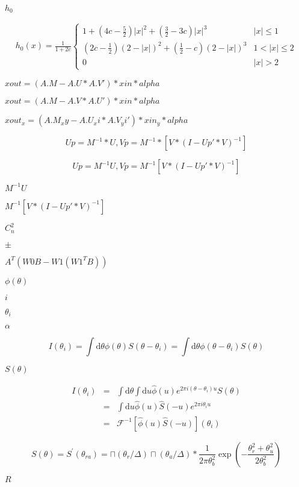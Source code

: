\documentclass{article}
\begin{document}
$h_{0}$
\pagebreak

\begin{eqnarray*} h_{0}(x)=\frac{1}{1+2c}\begin{cases} 1+(4c-\frac{5}{2})|x|^{2}+(\frac{3}{2}-3c)|x|^{3} & |x|\leq1\\ (2c-\frac{1}{2})(2-|x|)^{2}+(\frac{1}{2}-c)(2-|x|)^{3} & 1<|x|\leq2\\ 0 & |x|>2\end{cases}\end{eqnarray*}
\pagebreak

$xout=(A.M-A.U*A.V')*xin*alpha$
\pagebreak

$xout=(A.M-A.V*A.U')*xin*alpha$
\pagebreak

$xout_x=(A.M_xy-A.U_xi*A.V_yi')*xin_y*alpha$
\pagebreak

\[ Up=M^{-1}*U, Vp=M^{-1}*[V*(I-Up'*V)^{-1}] \]
\pagebreak

\[ Up=M^{-1}U, Vp=M^{-1}[V*(I-Up'*V)^{-1}] \]
\pagebreak

$M^{-1}U$
\pagebreak

$M^{-1}[V*(I-Up'*V)^{-1}]$
\pagebreak

$C_n^2$
\pagebreak

$\pm$
\pagebreak

$A^T(W0 B-W1 (W1^T B))$
\pagebreak

$\phi(\theta)$
\pagebreak

$i$
\pagebreak

$\theta_{i}$
\pagebreak

$\alpha$
\pagebreak

\[ I(\theta_{i})=\int\textrm{d}\theta\phi(\theta)S(\theta-\theta_{i})=\int\textrm{d}\theta\phi(\theta-\theta_{i})S(\theta)\]
\pagebreak

$S(\theta)$
\pagebreak

\begin{eqnarray*} I(\theta_{i}) & = & \int\textrm{d}\theta\int\textrm{d} u\hat{\phi}(u)e^{2\pi i(\theta-\theta_{i})u}S(\theta)\\ & = & \int\textrm{d} u\hat{\phi}(u)\hat{S}(-u)e^{2\pi i\theta_{i}u}\\ & = & \mathcal{F}^{-1}[\hat{\phi}(u)\hat{S}(-u)](\theta_{i})\end{eqnarray*}
\pagebreak

\[ S(\theta)=S^{\prime}(\theta_{ra})=\sqcap(\theta_{r}/\Delta)\sqcap(\theta_{a}/\Delta)*\frac{1}{2\pi \theta_b^2}\exp(-\frac{\theta_r^2+\theta_u^2}{2\theta_b^2}) \]
\pagebreak

$R$
\pagebreak
\end{document}
